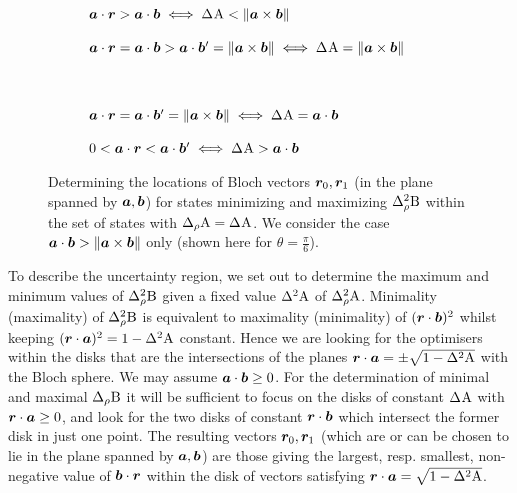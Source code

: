 \begin{figure}[h]
  \centering
  \begin{subfigure}{0.45\textwidth}
    \caption{$\boa\cdot\bor > \boa\cdot\bob \iff \sdev{\opa} < \|\boa\times\bob\|$}
  \end{subfigure}\hfill
  \begin{subfigure}{0.45\textwidth}
    \caption{$\boa\cdot\bor = \boa\cdot\bob > \boa\cdot\bob^\prime = \|\boa\times\bob\| \iff \sdev{\opa} = \|\boa\times\bob\|$}
  \end{subfigure}\\
  \begin{subfigure}{0.45\textwidth}
    \caption{$\boa\cdot\bor = \boa\cdot\bob^\prime = \|\boa\times\bob\| \iff \sdev{\opa} =\boa\cdot\bob$}
  \end{subfigure}\hfill
  \begin{subfigure}{0.45\textwidth}
    \caption{$0 < \boa\cdot\bor < \boa\cdot\bob^\prime \iff \sdev{\opa} > \boa\cdot\bob$}
  \end{subfigure}
  \caption[The Bloch vectors of the states minimizing and maximizing $\varr{\opb}$ given $\sdevr{\opa}=\sdev{\opa}$]{Determining the locations of Bloch vectors $\bm{r}_0,\bm{r}_1$ (in the plane spanned by $\bm{a},\bm{b}$) for states minimizing and maximizing $\varr{\opb}$ within the set of states with $\sdevr{\opa}=\sdev{\opa}$. We consider the case $\bm{a}\cdot\bm{b} > \|\bm{a}\times\bm{b}\|$ only (shown here for $\theta = \frac{\pi}{6}$). }\label{fig:min-max}
\end{figure}


To describe the uncertainty region, we set out to determine the maximum and minimum values of $\varr{\opb}$ given a fixed value $\var{\opa}$ of $\varr{\opa}$.
Minimality (maximality) of $\varr{\opb}$   is equivalent to maximality (minimality) of $(\bm{r}\cdot\bm{b})^2$ whilst keeping $(\bor\cdot\boa)^2=1-\var{\opa}$ constant. Hence we are looking for the optimisers within the disks that are the intersections of the planes $\bor\cdot\boa=\pm\sqrt{1-\var{\opa}}$ with the Bloch sphere. We may assume $\bm{a}\cdot\bm{b}\ge0$. For the determination of minimal and maximal $\sdevr{\opb}$  it will be sufficient to focus on the disks of constant $\sdev{\opa}$ with $\bm{r}\cdot\bm{a}\ge0$, and look for the two disks of constant  $\bm{r}\cdot\bm{b}$ which intersect the former disk in just one point. The resulting vectors $\bm{r}_0,\bm{r}_1$ (which are or can be chosen to lie in the plane spanned by $\bm{a},\bm{b}$) are those giving the largest, resp. smallest, non-negative value of $\bm{b}\cdot\bm{r}$ within the disk of vectors satisfying $\bor\cdot\boa=\sqrt{1-\var{\opa}}$.

